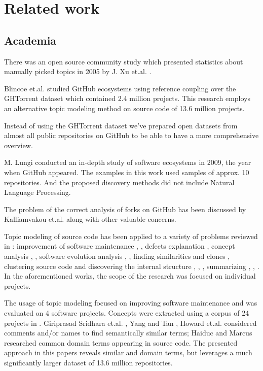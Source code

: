 \documentclass[conference,10pt]{IEEEtran}
\begin{document}
\section{Related work}
\subsection{Academia}
There was an open source community study which presented statistics about manually picked topics in 2005 by J. Xu et.al. \cite{JinXu2005}.

Blincoe et.al. \cite{Blincoe:2015:EGM:2820518.2820544} studied GitHub ecosystems using reference coupling over the GHTorrent dataset \cite{Gousi13} which contained 2.4 million projects. This research employs an alternative topic modeling method on source code of 13.6 million projects.

Instead of using the GHTorrent dataset we've prepared open datasets from almost all public repositories on GitHub to be able to have a more comprehensive overview. 

M. Lungi \cite{Lungu} conducted an in-depth study of software ecosystems in 2009, the year when GitHub appeared. The examples in this work used samples of approx. 10 repositories. And the proposed discovery methods did not include Natural Language Processing.

The problem of the correct analysis of forks on GitHub has been discussed by Kalliamvakou et.al. \cite{Kalliamvakou:2014:PPM:2597073.2597074} along with other valuable concerns.

Topic modeling of source code has been applied to a variety of problems reviewed in \cite{7515925}: improvement of software maintenance \cite{6178887}, \cite{6747182}, defects explanation \cite{Chen:2012:ESD:2664446.2664476}, concept analysis \cite{4656403}, \cite{Linstead:2007:MCC:1321631.1321709}, software evolution analysis \cite{4725072}, \cite{Thomas:2011:MET:1985441.1985467}, finding similarities and clones \cite{889845}, clustering source code and discovering the internal structure \cite{802296}, \cite{Kuhn:2007:SCI:1224560.1224698}, \cite{Thomas:2011:MSR:1985793.1986020}, summarizing \cite{6613829}, \cite{McBurney:2014:ITM:2597008.2597793}, \cite{Saeidi:2015:IIT:2820282.2820331}. In the aforementioned works, the scope of the research was focused on individual projects. 

The usage of topic modeling \cite{Sun:2015:MSR:2799128.2799145} focused on improving software maintenance and was evaluated on 4 software projects. Concepts were extracted using a corpus of 24 projects in \cite{10.1109/ICPC.2010.12}. Giriprasad Sridhara et.al. \cite{10.1109/ICPC.2008.18}, Yang and Tan \cite{Yang:2012:ISR:2664446.2664472}, Howard et.al. \cite{Howard:2013:AMS:2487085.2487155} considered comments and/or names to find semantically similar terms; Haiduc and Marcus \cite{10.1109/ICPC.2008.29} researched common domain terms appearing in source code. The presented approach in this papers reveals similar and domain terms, but leverages a much significantly larger dataset of 13.6 million repositories.
\end{document}
